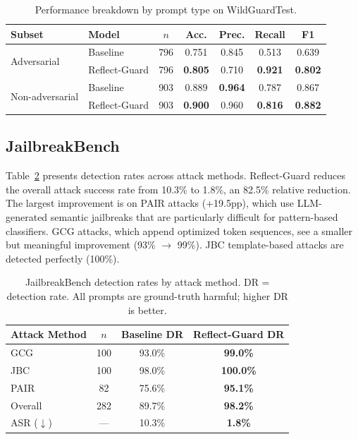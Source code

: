 \documentclass[11pt]{article}
\begin{document}
\begin{table}[t]
  \caption{Performance breakdown by prompt type on WildGuardTest.}
  \label{tab:wildguard_subset}
  \centering
  \begin{tabular}{llccccc}
    \toprule
    Subset & Model & $n$ & Acc. & Prec. & Recall & F1 \\
    \midrule
    \multirow{2}{*}{Adversarial}
    & Baseline & 796 & 0.751 & 0.845 & 0.513 & 0.639 \\
    & Reflect-Guard & 796 & \textbf{0.805} & 0.710 & \textbf{0.921} & \textbf{0.802} \\
    \midrule
    \multirow{2}{*}{Non-adversarial}
    & Baseline & 903 & 0.889 & \textbf{0.964} & 0.787 & 0.867 \\
    & Reflect-Guard & 903 & \textbf{0.900} & 0.960 & \textbf{0.816} & \textbf{0.882} \\
    \bottomrule
  \end{tabular}
\end{table}

\subsection{JailbreakBench}

Table~\ref{tab:jailbreakbench} presents detection rates across attack methods. Reflect-Guard reduces the overall attack success rate from 10.3\% to 1.8\%, an 82.5\% relative reduction. The largest improvement is on PAIR attacks (+19.5pp), which use LLM-generated semantic jailbreaks that are particularly difficult for pattern-based classifiers. GCG attacks, which append optimized token sequences, see a smaller but meaningful improvement (93\% $\to$ 99\%). JBC template-based attacks are detected perfectly (100\%).

\begin{table}[t]
  \caption{JailbreakBench detection rates by attack method. DR = detection rate. All prompts are ground-truth harmful; higher DR is better.}
  \label{tab:jailbreakbench}
  \centering
  \begin{tabular}{lccc}
    \toprule
    Attack Method & $n$ & Baseline DR & Reflect-Guard DR \\
    \midrule
    GCG & 100 & 93.0\% & \textbf{99.0\%} \\
    JBC & 100 & 98.0\% & \textbf{100.0\%} \\
    PAIR & 82 & 75.6\% & \textbf{95.1\%} \\
    \midrule
    Overall & 282 & 89.7\% & \textbf{98.2\%} \\
    \midrule
    ASR ($\downarrow$) & --- & 10.3\% & \textbf{1.8\%} \\
    \bottomrule
  \end{tabular}
\end{table}
\end{document}
